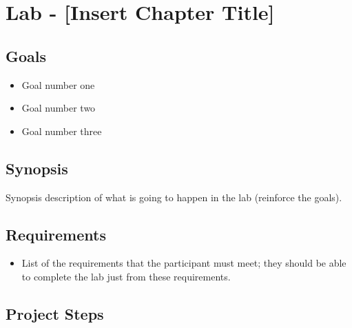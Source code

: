 \documentclass[../workbook]{subfiles}
\begin{document}

\section{Lab - [Insert Chapter Title]}

\begin{sectiontopics}
\end{sectiontopics}
    


\subsection*{Goals}

\begin{itemize}
\item Goal number one
\item Goal number two
\item Goal number three
\end{itemize}


\subsection*{Synopsis}

Synopsis description of what is going to happen in the lab (reinforce the goals).



\subsection*{Requirements}

\begin{itemize}
\item List of the requirements that the participant must meet; they should be able to complete the lab just from these requirements.
\end{itemize}


\subsection*{Project Steps}
\end{document}
